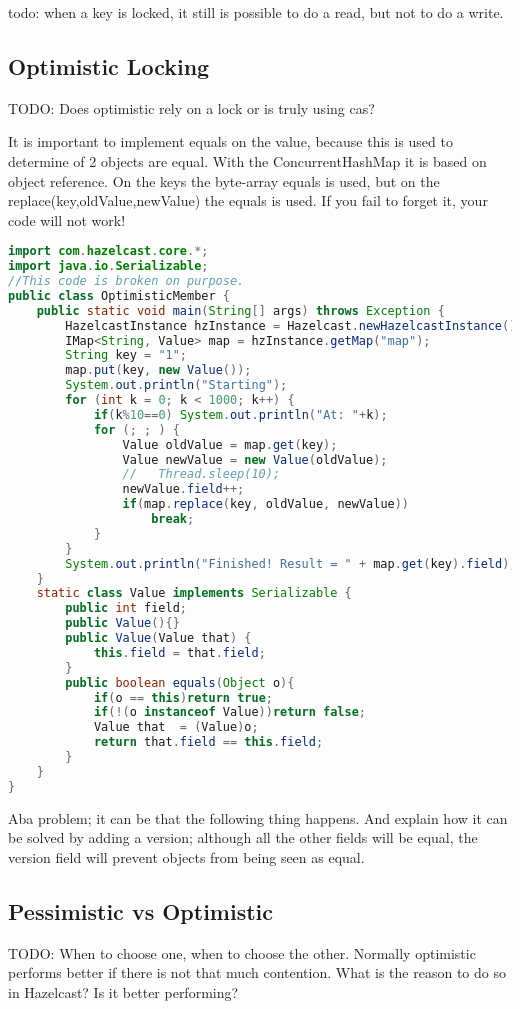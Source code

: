 todo: when a key is locked, it still is possible to do a read, but not to do a write.

\subsection{Optimistic Locking}
TODO: Does optimistic rely on a lock or is truly using cas?

It is important to implement equals on the value, because this is used to determine of 2 objects are equal. With the ConcurrentHashMap it is based on object reference. On the keys the byte-array equals is used, but on the replace(key,oldValue,newValue) the equals is used. If you fail to forget it, your code will not work!

\begin{lstlisting}[language=java]
import com.hazelcast.core.*;
import java.io.Serializable;
//This code is broken on purpose.
public class OptimisticMember {
    public static void main(String[] args) throws Exception {
        HazelcastInstance hzInstance = Hazelcast.newHazelcastInstance();
        IMap<String, Value> map = hzInstance.getMap("map");
        String key = "1";
        map.put(key, new Value());
        System.out.println("Starting");
        for (int k = 0; k < 1000; k++) {
            if(k%10==0) System.out.println("At: "+k);
            for (; ; ) {
                Value oldValue = map.get(key);
                Value newValue = new Value(oldValue);
                //   Thread.sleep(10);
                newValue.field++;
                if(map.replace(key, oldValue, newValue))
                    break;
            }
        }
        System.out.println("Finished! Result = " + map.get(key).field);
    }
    static class Value implements Serializable {
        public int field;
        public Value(){}
        public Value(Value that) {
            this.field = that.field;
        }
        public boolean equals(Object o){
            if(o == this)return true;
            if(!(o instanceof Value))return false;
            Value that  = (Value)o;
            return that.field == this.field;
        }
    }
}
\end{lstlisting}
Aba problem; it can be that the following thing happens. And explain how it can be solved by adding a version; although all the other fields will be equal, the version field will prevent objects from being seen as equal.

\subsection{Pessimistic vs Optimistic}
TODO: When to choose one, when to choose the other. Normally optimistic performs better if there is not that much contention. What is the reason to do so in Hazelcast? Is it better performing?

